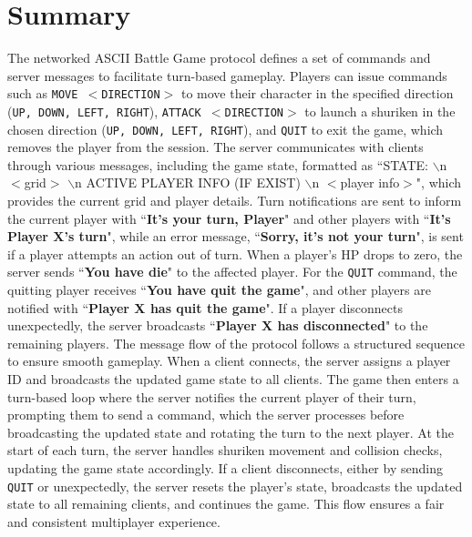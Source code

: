 \documentclass{article}
\begin{document}
\section*{Summary}
The networked ASCII Battle Game protocol defines a set of commands and server messages to facilitate turn-based gameplay. Players can issue commands such as \texttt{MOVE $<$DIRECTION$>$} to move their character in the specified direction (\texttt{UP, DOWN, LEFT, RIGHT}), \texttt{ATTACK $<$DIRECTION$>$} to launch a shuriken in the chosen direction (\texttt{UP, DOWN, LEFT, RIGHT}), and \texttt{QUIT} to exit the game, which removes the player from the session. 
\newline
\newline
The server communicates with clients through various messages, including the game state, formatted as ``STATE: $\backslash$n $<$grid$>$ $\backslash$n ACTIVE PLAYER INFO (IF EXIST) $\backslash$n $<$player info$>$", which provides the current grid and player details. 
\newline
\newline
Turn notifications are sent to inform the current player with ``\textbf{It's your turn, Player}" and other players with ``\textbf{It's Player X's turn}", while an error message, ``\textbf{Sorry, it's not your turn}", is sent if a player attempts an action out of turn. 
\newline
\newline
When a player's HP drops to zero, the server sends ``\textbf{You have die}" to the affected player. For the \texttt{QUIT} command, the quitting player receives ``\textbf{You have quit the game}", and other players are notified with ``\textbf{Player X has quit the game}". If a player disconnects unexpectedly, the server broadcasts ``\textbf{Player X has disconnected}" to the remaining players.
\newline
\newline
The message flow of the protocol follows a structured sequence to ensure smooth gameplay. When a client connects, the server assigns a player ID and broadcasts the updated game state to all clients. The game then enters a turn-based loop where the server notifies the current player of their turn, prompting them to send a command, which the server processes before broadcasting the updated state and rotating the turn to the next player. At the start of each turn, the server handles shuriken movement and collision checks, updating the game state accordingly. If a client disconnects, either by sending \texttt{QUIT} or unexpectedly, the server resets the player's state, broadcasts the updated state to all remaining clients, and continues the game. This flow ensures a fair and consistent multiplayer experience.
\end{document}
